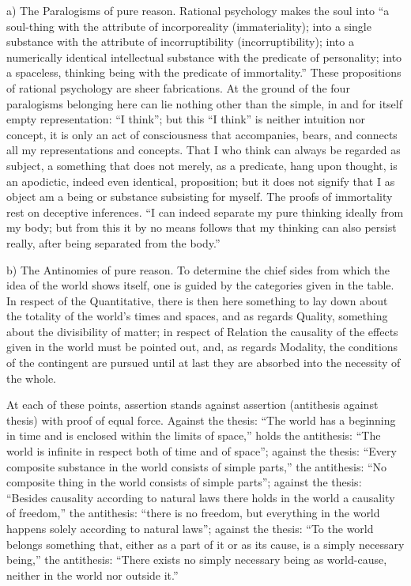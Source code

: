 \documentclass[12pt]{book}
\begin{document}
a) The Paralogisms of pure reason. Rational psychology makes the soul into ``a
soul-thing with the attribute of incorporeality (immateriality); into a single
substance with the attribute of incorruptibility (incorruptibility); into a
numerically identical intellectual substance with the predicate of personality;
into a spaceless, thinking being with the predicate of immortality.'' These
propositions of rational psychology are sheer fabrications. At the ground of the
four paralogisms belonging here can lie nothing other than the simple, in and for
itself empty representation: ``I think''; but this ``I think'' is neither
intuition nor concept, it is only an act of consciousness that accompanies, bears,
and connects all my representations and concepts. That I who think can always be
regarded as subject, a something that does not merely, as a predicate, hang upon
thought, is an apodictic, indeed even identical, proposition; but it does not
signify that I as object am a being or substance subsisting for myself. The proofs
of immortality rest on deceptive inferences. ``I can indeed separate my pure
thinking ideally from my body; but from this it by no means follows that my
thinking can also persist really, after being separated from the body.''

b) The Antinomies of pure reason. To determine the chief sides from which the idea
of the world shows itself, one is guided by the categories given in the table. In
respect of the Quantitative, there is then here something to lay down about the
totality of the world's times and spaces, and as regards Quality, something about
the divisibility of matter; in respect of Relation the causality of the effects
given in the world must be pointed out, and, as regards Modality, the conditions
of the contingent are pursued until at last they are absorbed into the necessity
of the whole.

At each of these points, assertion stands against assertion (antithesis against
thesis) with proof of equal force. Against the thesis: ``The world has a beginning
in time and is enclosed within the limits of space,'' holds the antithesis: ``The
world is infinite in respect both of time and of space''; against the thesis:
``Every composite substance in the world consists of simple parts,'' the
antithesis: ``No composite thing in the world consists of simple parts''; against
the thesis: ``Besides causality according to natural laws there holds in the world
a
causality of freedom,'' the antithesis: ``there is no freedom, but everything in
the world happens solely according to natural laws''; against the thesis: ``To the
world belongs something that, either as a part of it or as its cause, is a simply
necessary being,'' the antithesis: ``There exists no simply necessary being as
world-cause, neither in the world nor outside it.''
\end{document}
